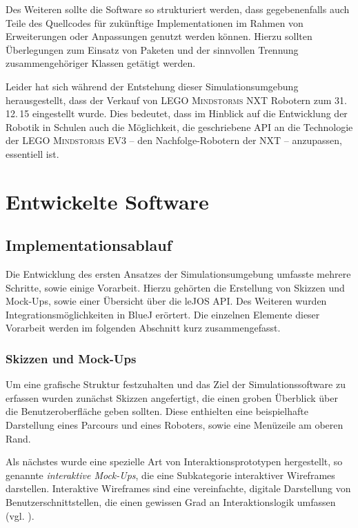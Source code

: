 \documentclass[paper=a4, DIV=calc, BCOR=12mm, twoside=on, onecolumn=on, open = right, titlepage =on, parskip =half-, headsepline = on, footsepline = off, chapterprefix = off, appendixprefix = on, fontsize = 12pt, numbers = noenddot, abstract = on]{scrbook}
\begin{document}
Des Weiteren sollte die Software so strukturiert werden, dass gegebenenfalls auch Teile des Quellcodes für zukünftige Implementationen im Rahmen von Erweiterungen oder Anpassungen genutzt werden können. Hierzu sollten Überlegungen zum Einsatz von Paketen und der sinnvollen Trennung zusammengehöriger Klassen getätigt werden.

Leider hat sich während der Entstehung dieser Simulationsumgebung herausgestellt, dass der Verkauf von \textsc{LEGO Mindstorms} NXT Robotern zum 31.\,12.\,15 eingestellt wurde. Dies bedeutet, dass im Hinblick auf die Entwicklung der Robotik in Schulen auch die Möglichkeit, die geschriebene API an die Technologie der \textsc{LEGO Mindstorms} EV3 --  den Nachfolge-Robotern der NXT -- anzupassen, essentiell ist.


\par \singlespacing
\chapter{Entwickelte Software}
\onehalfspacing
\par \singlespacing
\section{Implementationsablauf}
\onehalfspacing
Die Entwicklung des ersten Ansatzes der Simulationsumgebung umfasste mehrere Schritte, sowie einige Vorarbeit. Hierzu gehörten die Erstellung von Skizzen und Mock-Ups, sowie einer Übersicht über die leJOS API. Des Weiteren wurden Integrationsmöglichkeiten in BlueJ erörtert. Die einzelnen Elemente dieser Vorarbeit werden im folgenden Abschnitt kurz zusammengefasst. 
\par \singlespacing
\subsection{Skizzen und Mock-Ups} 
\onehalfspacing
Um eine grafische Struktur festzuhalten und das Ziel der Simulationssoftware zu erfassen wurden zunächst Skizzen angefertigt, die einen groben Überblick über die Benutzeroberfläche geben sollten. Diese enthielten eine beispielhafte Darstellung eines Parcours und eines Roboters, sowie eine Menüzeile am oberen Rand. 

Als nächstes wurde eine spezielle Art von Interaktionsprototypen hergestellt, so genannte \emph{interaktive Mock-Ups}, die eine Subkategorie interaktiver Wireframes darstellen. Interaktive Wireframes sind eine vereinfachte, digitale Darstellung von Benutzerschnittstellen, die einen gewissen Grad an Interaktionslogik umfassen (vgl. \cite[S.162ff.]{moser:12}).
\end{document}
